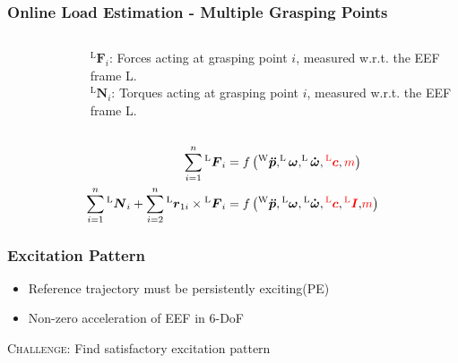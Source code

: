 \documentclass[student,noshadow]{ITRslides}
\renewcommand{\vec}[1]{\boldsymbol{#1}}
\renewcommand{\vec}[1]{\boldsymbol{#1}}
\newcommand{\scr}[1]{\mathrm{#1}}
\begin{document}
\begin{frame}
	\frametitle{Online Load Estimation - Multiple Grasping Points}
	\begin{columns}
		\begin{column}{0.5\textwidth}
			\begin{figure}
				\centering
				
			\end{figure}	
		\end{column}
		\begin{column}{0.5\textwidth}
			$^\scr{L}\vec{F}_i$: Forces acting at grasping point $i$, measured w.r.t. the EEF frame L.\\ \vspace{0.3cm}
			$^\scr{L}\vec{N}_i$: Torques acting at grasping point $i$, measured w.r.t. the EEF frame L.\\
		\end{column}
	\end{columns}
	
	\begin{align*} 
		\sum_{i = 1}^{n}  {^\scr{L}}\vec{F}_{i}                                                                   & =  f\left(^\scr{W}\vec{\ddot{p}},^\scr{L}\vec{\omega},^\scr{L}\vec{\dot{\omega}},\color{red}^\scr{L}\vec{c}\color{black},\color{red}m\color{black}\right)                          \\ 
		\sum_{i = 1}^n {^\scr{L}}\vec{N}_{i} + \sum_{i = 2}^n {^\scr{L}}\vec{r}_{1i} \times {^\scr{L}}\vec{F}_{i} & = f\left({^\scr{W}}\vec{\ddot{p}},{^\scr{L}}\vec{\omega},{^\scr{L}}\vec{\dot{\omega}},\color{red}{^\scr{L}}\vec{c}\color{black},\color{red}{{^\scr{L}}\vec{I}}\color{black}{,}\color{red}{m} \color{black}\right) 
	\end{align*}
\end{frame}

\begin{frame}
	\frametitle{Excitation Pattern}
	\vspace{1cm}	
	\begin{itemize}
		\item Reference trajectory must be persistently exciting(PE)
		\item Non-zero acceleration of EEF in 6-DoF \cite{literaturstelle3}
	\end{itemize}
	\vspace{1cm}
	\textsc{Challenge}: Find satisfactory excitation pattern
\end{frame}
\end{document}
